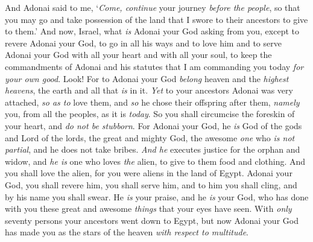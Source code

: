 \begin{biblechapter}
\verse And Adonai said to me, ‘\textit{Come, continue} your journey \textit{before the people},  so that you may go and take possession of the land that I swore to their ancestors to give to them.’
\verse And now, Israel, what \textit{is} Adonai your God asking from you, except to revere Adonai your God, to go in all his ways and to love him and to serve Adonai your God with all your heart and with all your soul,
\verse to keep the commandments of Adonai and his statutes that I am commanding you today \textit{for your own good}.
\verse Look! For to Adonai your God \textit{belong} heaven and the \textit{highest heavens}, the earth and all that \textit{is} in it.
\verse \textit{Yet} to your ancestors Adonai was very attached, \textit{so as to} love them, and \textit{so} he chose their offspring after them, \textit{namely} you, from all the peoples, as it is \textit{today}.
\verse So you shall circumcise the foreskin of your heart, and \textit{do not be stubborn}.
\verse For Adonai your God, he \textit{is} God of the gods and Lord of the lords, the great and mighty God, the awesome \textit{one} who \textit{is not partial}, and he does not take bribes.
\verse \textit{And he} executes justice for the orphan and widow, and \textit{he is} one who loves \textit{the} alien, to give to them food and clothing.
\verse And you shall love the alien, for you were aliens in the land of Egypt.
\verse Adonai your God, you shall revere him, you shall serve him, and to him you shall cling, and by his name you shall swear.
\verse He \textit{is} your praise, and he \textit{is} your God, who has done with you these great and awesome \textit{things} that your eyes have seen.
\verse With \textit{only} seventy persons your ancestors went down to Egypt, but now Adonai your God has made you as the stars of the heaven \textit{with respect to multitude}.
\end{biblechapter}

